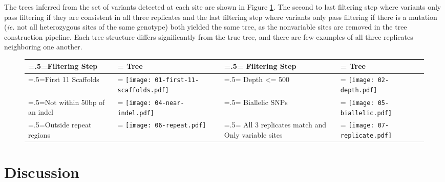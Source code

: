 The trees inferred from the set of variants detected at each site are shown in Figure \ref{fig:ev_filtertrees}. The second to last filtering step where variants only pass filtering if they are consistent in all three replicates and the last filtering step where variants only pass filtering if there is a mutation (\textit{ie.} not all heterozygous sites of the same genotype) both yielded the same tree, as the nonvariable sites are removed in the tree construction pipeline. Each tree structure differs significantly from the true tree, and there are few examples of all three replicates neighboring one another.


\begin{figure}
\centering
\begin{tabularx}{\textwidth}{ >{\hsize=.5\hsize\linewidth=\hsize}X >{\hsize=1.5\hsize\linewidth=\hsize}X | >{\hsize=.5\hsize\linewidth=\hsize}X >{\hsize=1.5\hsize\linewidth=\hsize}X }
\toprule
Filtering Step & Tree & Filtering Step & Tree \\
\midrule
First 11 Scaffolds & \texttt{[image: 01-first-11-scaffolds.pdf]} &
Depth <= 500 & \texttt{[image: 02-depth.pdf]} \\
Not within 50bp of an indel & \texttt{[image: 04-near-indel.pdf]} &
Biallelic SNPs & \texttt{[image: 05-biallelic.pdf]}\\
Outside repeat regions & \texttt{[image: 06-repeat.pdf]} &
All 3 replicates match and Only variable sites & \texttt{[image: 07-replicate.pdf]}\\
\bottomrule
\end{tabularx}
\label{fig:ev_filtertrees}
\end{figure}

\section{Discussion}


